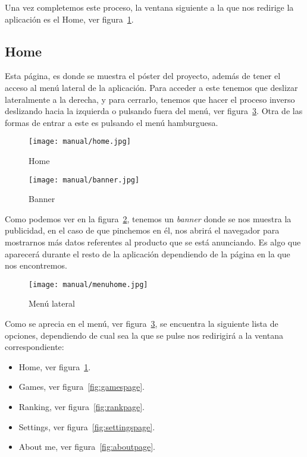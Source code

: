 Una vez completemos este proceso, la ventana siguiente a la que nos redirige la aplicación es el Home, ver figura~\ref{fig:homepage}.


\subsection{Home}\label{home}
Esta página, es donde se muestra el póster del proyecto, además de tener el acceso al menú lateral de la aplicación. Para acceder a este tenemos que deslizar lateralmente a la derecha, y para cerrarlo, tenemos que hacer el proceso inverso deslizando hacia la izquierda o pulsando fuera del menú, ver figura~\ref{fig:menuhome}. Otra de las formas de entrar a este es pulsando el menú hamburguesa.

\begin{figure}%
	\centering
	\texttt{[image: manual/home.jpg]}
	\caption{Home}\label{fig:homepage}
\end{figure}

\begin{figure}%
	\centering
	\texttt{[image: manual/banner.jpg]}
	\caption{Banner}\label{fig:banner}
\end{figure}

Como podemos ver en la figura~\ref{fig:banner}, tenemos un \emph{banner} donde se nos muestra la publicidad, en el caso de que pinchemos en él, nos abrirá el navegador para mostrarnos más datos referentes al producto que se está anunciando. Es algo que aparecerá durante el resto de la aplicación dependiendo de la página en la que nos encontremos.

\begin{figure}%
	\centering
	\texttt{[image: manual/menuhome.jpg]}
	\caption{Menú lateral}\label{fig:menuhome}
\end{figure}
 
Como se aprecia en el menú, ver figura~\ref{fig:menuhome},  se encuentra la siguiente lista de opciones, dependiendo de cual sea la que se pulse nos redirigirá a la ventana correspondiente:

\begin{itemize}
	\item Home, ver figura~\ref{fig:homepage}.
	\item Games, ver figura~\ref{fig:gamespage}.
	\item Ranking, ver figura~\ref{fig:rankpage}.
	\item Settings, ver figura~\ref{fig:settingspage}.
	\item About me, ver figura~\ref{fig:aboutpage}.
\end{itemize}

